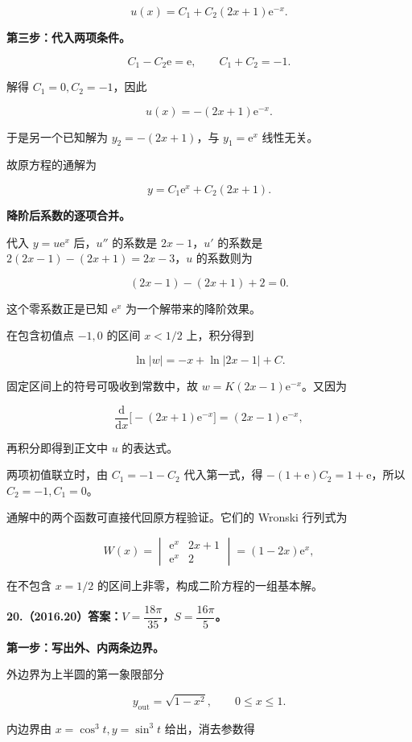 \documentclass[UTF8,11pt,fontset=windows]{ctexart}
\begin{document}
$$
u(x)=C_1+C_2(2x+1)\mathrm e^{-x}.
$$

\textbf{第三步：代入两项条件。}

$$
C_1-C_2\mathrm e=\mathrm e,
\qquad C_1+C_2=-1.
$$

解得 $C_1=0,C_2=-1$，因此

$$
u(x)=-(2x+1)\mathrm e^{-x}.
$$

于是另一个已知解为 $y_2=-(2x+1)$，与 $y_1=\mathrm e^x$ 线性无关。

故原方程的通解为

$$
y=C_1\mathrm e^x+C_2(2x+1).
$$

\textbf{降阶后系数的逐项合并。}

代入 $y=u\mathrm e^x$ 后，$u''$ 的系数是 $2x-1$，$u'$ 的系数是 $2(2x-1)-(2x+1)=2x-3$，$u$ 的系数则为

$$
(2x-1)-(2x+1)+2=0.
$$

这个零系数正是已知 $\mathrm e^x$ 为一个解带来的降阶效果。

在包含初值点 $-1,0$ 的区间 $x<1/2$ 上，积分得到

$$
\ln|w|=-x+\ln|2x-1|+C.
$$

固定区间上的符号可吸收到常数中，故 $w=K(2x-1)\mathrm e^{-x}$。又因为

$$
\frac{\mathrm d}{\mathrm dx}\bigl[-(2x+1)\mathrm e^{-x}\bigr]
=(2x-1)\mathrm e^{-x},
$$

再积分即得到正文中 $u$ 的表达式。

两项初值联立时，由 $C_1=-1-C_2$ 代入第一式，得 $-(1+\mathrm e)C_2=1+\mathrm e$，所以 $C_2=-1,C_1=0$。

通解中的两个函数可直接代回原方程验证。它们的 Wronski 行列式为

$$
W(x)=\begin{vmatrix}\mathrm e^x&2x+1\\\mathrm e^x&2\end{vmatrix}
=(1-2x)\mathrm e^x,
$$

在不包含 $x=1/2$ 的区间上非零，构成二阶方程的一组基本解。

\clearpage

\textbf{20.（2016.20）答案：$V=\dfrac{18\pi}{35}$，$S=\dfrac{16\pi}{5}$。}

\textbf{第一步：写出外、内两条边界。}

外边界为上半圆的第一象限部分

$$
y_{\mathrm{out}}=\sqrt{1-x^2},\qquad0\le x\le1.
$$

内边界由 $x=\cos^3t,y=\sin^3t$ 给出，消去参数得
\end{document}
